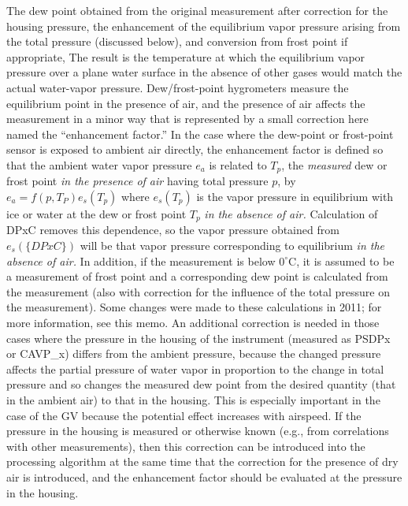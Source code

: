 \documentclass[
  english,
]{book}
\begin{document}
The dew point obtained from the original measurement after correction for the housing pressure, the enhancement of the equilibrium vapor pressure arising from the total pressure (discussed below), and conversion from frost point if appropriate, The result is the temperature at which the equilibrium vapor pressure over a plane water surface in the absence of other gases would match the actual water-vapor pressure. Dew/frost-point hygrometers measure the equilibrium point in the presence of air, and the presence of air affects the measurement in a minor way that is represented by a small correction here named the ``enhancement factor.'' In the case where the dew-point or frost-point sensor is exposed to ambient air directly, the enhancement factor is defined so that the ambient water vapor pressure \(e_a\) is related to \(T_p\), the \emph{measured} dew or frost point \emph{in the presence of air} having total pressure \(p\), by \(e_a=f(p,T_P)e_s(T_p)\) where \(e_s(T_p)\) is the vapor pressure in equilibrium with ice or water at the dew or frost point \(T_p\) \emph{in the absence of air.} Calculation of DPxC removes this dependence, so the vapor pressure obtained from \(e_s(\{DPxC\})\) will be that vapor pressure corresponding to equilibrium \emph{in the absence of air.} In addition, if the measurement is below \(0^\circ\mathrm{C}\), it is assumed to be a measurement of frost point and a corresponding dew point is calculated from the measurement (also with correction for the influence of the total pressure on the measurement). Some changes were made to these calculations in 2011; for more information, see this memo.
An additional correction is needed in those cases where the pressure in the housing of the instrument (measured as PSDPx or CAVP\_x) differs from the ambient pressure, because the changed pressure affects the partial pressure of water vapor in proportion to the change in total pressure and so changes the measured dew point from the desired quantity (that in the ambient air) to that in the housing. This is especially important in the case of the GV because the potential effect increases with airspeed. If the pressure in the housing is measured or otherwise known (e.g., from correlations with other measurements), then this correction can be introduced into the processing algorithm at the same time that the correction for the presence of dry air is introduced, and the enhancement factor should be evaluated at the pressure in the housing.
\end{document}
